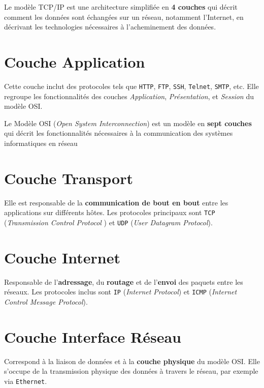 \documentclass[a4paper]{report}
\begin{document}
    \begin{Définition}
        Le modèle TCP/IP est une architecture simplifiée 
        en \textbf{4 couches}  qui décrit 
        comment les données sont échangées sur un réseau, 
        notamment l'Internet, en décrivant les technologies nécessaires 
        à l'acheminement des données.
    \end{Définition}        

    \section{Couche Application}
    Cette couche inclut des protocoles tels que \texttt{HTTP}, 
    \texttt{FTP}, \texttt{SSH}, \texttt{Telnet}, \texttt{SMTP}, etc. 
    Elle regroupe les fonctionnalités des couches \textit{Application}, 
    \textit{Présentation}, et \textit{Session} du modèle OSI.

    \begin{note}{}{}
        Le Modèle OSI (\textit{Open System Interconnection}) est un modèle 
        en \textbf{sept couches} qui décrit les fonctionnalités nécessaires 
        à la communication des systèmes informatiques en réseau
    \end{note}

    \section{Couche Transport}
    Elle est responsable de la \textbf{communication de bout en bout} entre 
    les applications sur différents hôtes. 
    Les protocoles principaux sont \texttt{TCP}   
    (\textit{Transmission Control Protocol}  ) 
    et \texttt{UDP}  (\textit{User Datagram Protocol}).

    \section{Couche Internet}
    Responsable de l'\textbf{adressage}, du \textbf{routage}  
    et de l'\textbf{envoi}  des paquets entre les réseaux. 
    Les protocoles inclus sont \texttt{IP}   (\textit{Internet Protocol}) 
    et \texttt{ICMP} (\textit{Internet Control Message Protocol}).

    \section{Couche Interface Réseau}
    Correspond à la liaison de données et à la 
    \textbf{couche physique} du modèle OSI. 
    Elle s'occupe de la transmission physique des données 
    à travers le réseau, par exemple via \texttt{Ethernet}.
\end{document}
